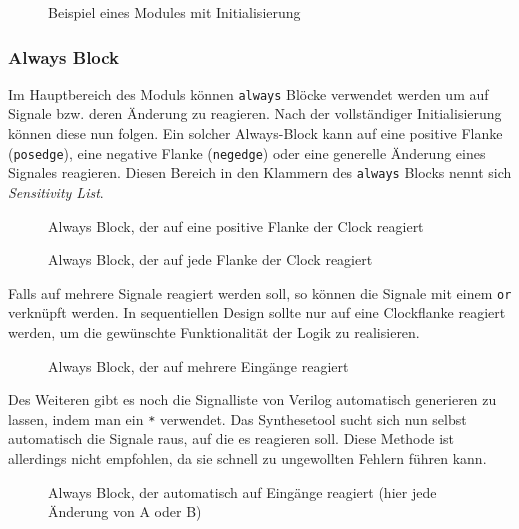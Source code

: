 \begin{figure}[H]
	\lstset{style=verilog-style}
	
	\caption{Beispiel eines Modules mit Initialisierung}
	\label{initial_begin}
\end{figure}

\subsubsection*{Always Block}
Im Hauptbereich des Moduls können \texttt{always} Blöcke verwendet werden um auf Signale bzw. deren Änderung zu reagieren. Nach der vollständiger Initialisierung können diese nun folgen. Ein solcher Always-Block kann auf eine positive Flanke (\texttt{posedge}), eine negative Flanke (\texttt{negedge}) oder eine generelle Änderung eines Signales reagieren. Diesen Bereich in den Klammern des \texttt{always} Blocks nennt sich \textit{Sensitivity List}.
\begin{figure}[H]
	\lstset{style=verilog-style}
	
	\caption{Always Block, der auf eine positive Flanke der Clock reagiert}
	\label{always_posedge}
\end{figure}
\begin{figure}[H]
\lstset{style=verilog-style}

\caption{Always Block, der auf jede Flanke der Clock reagiert}
\label{always_edge}
\end{figure}
Falls auf mehrere Signale reagiert werden soll, so können die Signale mit einem \texttt{or} verknüpft werden. In sequentiellen Design sollte nur auf eine Clockflanke reagiert werden, um die gewünschte Funktionalität der Logik zu realisieren.
\begin{figure}[H]
	\lstset{style=verilog-style}
	
	\caption{Always Block, der auf mehrere Eingänge reagiert}
	\label{always_multiple}
\end{figure}
Des Weiteren gibt es noch die Signalliste von Verilog automatisch generieren zu lassen, indem man ein \texttt{*} verwendet. Das Synthesetool sucht sich nun selbst automatisch die Signale raus, auf die es reagieren soll. Diese Methode ist allerdings nicht empfohlen, da sie schnell zu ungewollten Fehlern führen kann.
\begin{figure}[H]
	\lstset{style=verilog-style}
	
	\caption{Always Block, der automatisch auf Eingänge reagiert (hier jede Änderung von A oder B)}
	\label{always_star}
\end{figure}

